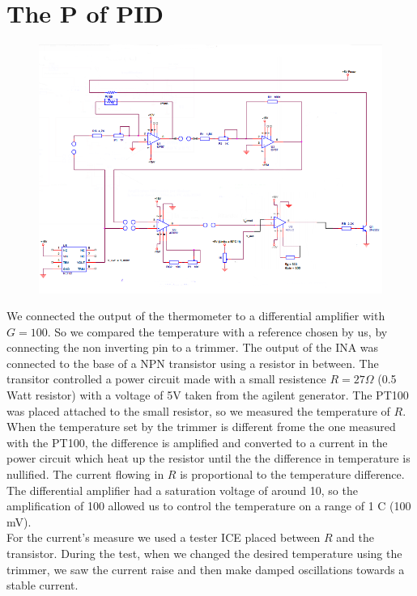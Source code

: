 \section{The P of PID}
\begin{figure}[H]
\centering
\includegraphics[width=.8\textwidth]{6/circuit2.png}
\end{figure}
We connected the output of the thermometer to a differential amplifier with $G=100$. So we compared the temperature with a reference chosen by us, by connecting the non inverting pin to a trimmer. The output of the INA was connected to the base of a NPN transistor using a resistor in between. The transitor controlled a power circuit made with a small resistence $R= 27 \Omega$ (0.5 Watt resistor) with a voltage of 5V taken from the agilent generator. The PT100 was placed attached to the small resistor, so we measured the temperature of $R$. When the temperature set by the trimmer is different frome the one measured with the PT100, the difference is amplified and converted to a current in the power circuit which heat up the resistor until the the difference in temperature is nullified. The current flowing in $R$ is proportional to the temperature difference. The differential amplifier had a saturation voltage of around 10, so the amplification of 100 allowed us to control the temperature on a range of 1 \degree C (100 mV).\\
For the current's measure we used a tester ICE placed between $R$ and the transistor. During the test, when we changed the desired temperature using the trimmer, we saw the current raise and then make damped oscillations towards a stable current.
